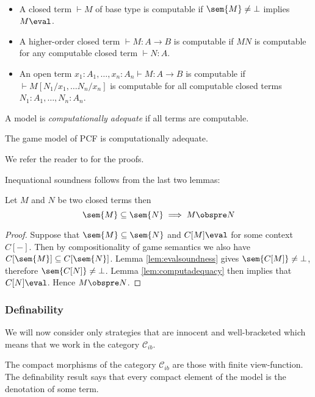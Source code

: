 \begin{definition} \
\begin{itemize}
\item A closed term $\vdash M$ of base type is computable if $\sem{M} \neq \bot$
implies $M \eval$.
\item A higher-order closed term $\vdash M : A\rightarrow B$ is computable if $M N$ is computable for any computable closed term $\vdash  N:A$.
\item An open term $x_1 : A_1, \ldots, x_n : A_n \vdash M : A\rightarrow B$ is computable if $\vdash M [N_1/x_1, \ldots N_n/x_n]$ is computable
for all computable closed terms $N_1:A_1, \ldots, N_n:A_n$.
\end{itemize}
\end{definition}

A model is \emph{computationally adequate} if all
terms are computable.
\begin{lemma}
\label{lem:computadequacy}
The game model of PCF is
computationally adequate.
\end{lemma}
We refer the reader to \cite{abramsky:game-semantics-tutorial} for
the proofs.

Inequational soundness follows from the last two lemmas:
\begin{proposition}
\label{prop:ineqsoundness} Let $M$ and $N$ be two closed terms then
$$\sem{M} \subseteq \sem{N} \implies  M \obspre N $$
\end{proposition}
\begin{proof}
  Suppose that $\sem{M} \subseteq \sem{N}$ and $C[M] \eval$ for some context $C[-]$. Then by compositionality of game semantics we also have
  $C[\sem{M}] \subseteq C[\sem{N}]$.
  Lemma \ref{lem:evalsoundness} gives $\sem{C[M]} \neq \bot$, therefore $\sem{C[N]} \neq \bot$.
  Lemma \ref{lem:computadequacy} then implies that $C[N] \eval$.
  Hence $M \obspre N$.
\end{proof}

\subsubsection{Definability}

We will now consider only strategies that are innocent and
well-bracketed which means that we work in the category
$\mathcal{C}_{ib}$.

The compact morphisms of the category $\mathcal{C}_{ib}$ are those
with finite view-function. The definability result says that every
compact element of the model is the denotation of some term.

